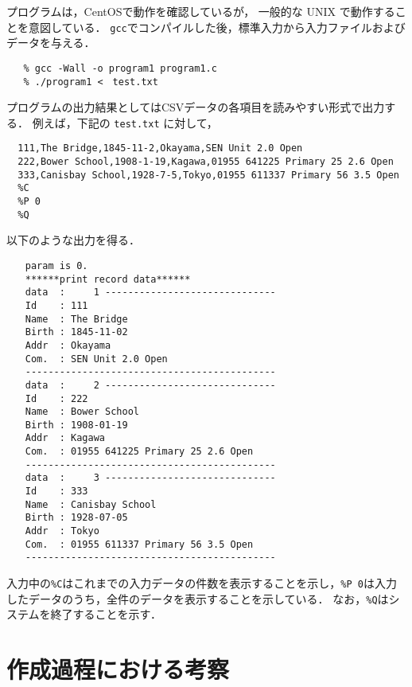 \documentclass[a4j,11pt]{jarticle}
\begin{document}
プログラムは，CentOSで動作を確認しているが，
一般的な UNIX で動作することを意図している．
\verb|gcc|でコンパイルした後，標準入力から入力ファイルおよびデータを与える．

{\fontsize{10pt}{11pt} \selectfont
 \begin{verbatim}
   % gcc -Wall -o program1 program1.c
   % ./program1 <　test.txt
 \end{verbatim}
}

プログラムの出力結果としてはCSVデータの各項目を読みやすい形式で出力する．
例えば，下記の \verb|test.txt| に対して，

{\fontsize{10pt}{11pt} \selectfont
 \begin{verbatim}
  111,The Bridge,1845-11-2,Okayama,SEN Unit 2.0 Open
  222,Bower School,1908-1-19,Kagawa,01955 641225 Primary 25 2.6 Open
  333,Canisbay School,1928-7-5,Tokyo,01955 611337 Primary 56 3.5 Open
  %C
  %P 0
  %Q
 \end{verbatim}
}
\noindent %
以下のような出力を得る．

{\fontsize{10pt}{11pt} \selectfont
 \begin{verbatim}
　　param is 0.
　　******print record data******
　　data  :     1 ------------------------------
　　Id    : 111
　　Name  : The Bridge
　　Birth : 1845-11-02
　　Addr  : Okayama
　　Com.  : SEN Unit 2.0 Open
　　--------------------------------------------
　　data  :     2 ------------------------------
　　Id    : 222
　　Name  : Bower School
　　Birth : 1908-01-19
　　Addr  : Kagawa
　　Com.  : 01955 641225 Primary 25 2.6 Open
　　--------------------------------------------
　　data  :     3 ------------------------------
　　Id    : 333
　　Name  : Canisbay School
　　Birth : 1928-07-05
　　Addr  : Tokyo
　　Com.  : 01955 611337 Primary 56 3.5 Open
　　--------------------------------------------

 \end{verbatim}
}

\noindent
入力中の\verb|%C|はこれまでの入力データの件数を表示することを示し，\verb|%P 0|は入力したデータのうち，全件のデータを表示することを示している．
なお，\verb|%Q|はシステムを終了することを示す．

\section{作成過程における考察}
\end{document}
